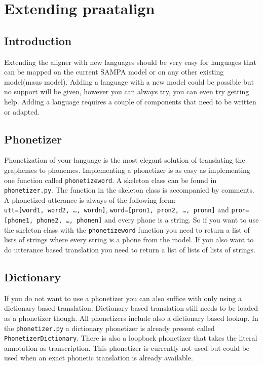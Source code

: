 \chapter{Extending praatalign}
\section{Introduction}
Extending the aligner with new languages should be very easy for languages that
can be mapped on the current SAMPA model or on any other existing model(maus
model).
Adding a language with a new model could be possible but no support will be
given, however you can always try, you can even try getting help. Adding a
language requires a couple of components that need to be written or adapted.

\section{Phonetizer}
Phonetization of your language is the most elegant solution of translating the
graphemes to phonemes. Implementing a phonetizer is as easy as implementing one
function called \texttt{phonetizeword}. A skeleton class can be found in
\texttt{phonetizer.py}. The function in the skeleton class is accompanied by
comments. A phonetized utterance is always of the following form:\\
\texttt{utt=[word1, word2, \ldots, wordn]}, 
\texttt{word=[pron1, pron2, \ldots, pronn]} and
\texttt{pron=[phone1, phone2, \ldots, phonen]} and every phone is a string.
So if you want to use the skeleton class with the \texttt{phonetizeword}
function you need to return a list of lists of strings where every
string is a phone from the model. If you also want to do utterance based
translation you need to return a list of lists of lists of strings.

\section{Dictionary}
If you do not want to use a phonetizer you can also suffice with only using a
dictionary based translation. Dictionary based translation still needs to be
loaded as a phonetizer though. All phonetizers include also a dictionary based
lookup. In the \texttt{phonetizer.py} a dictionary phonetizer is already
present called \texttt{PhonetizerDictionary}. There is also a loopback
phonetizer that takes the literal annotation as transcription. This phonetizer
is currently not used but could be used when an exact phonetic translation is
already available.

